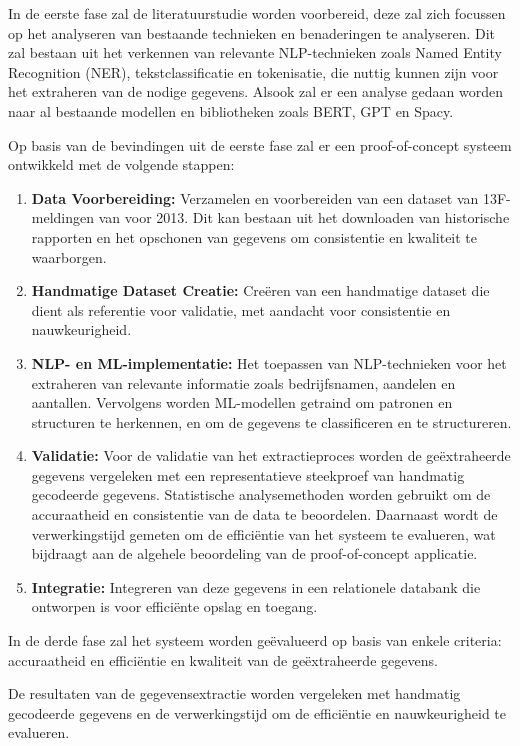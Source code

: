 In de eerste fase zal de literatuurstudie worden voorbereid, deze zal zich focussen op het analyseren van bestaande technieken en benaderingen te analyseren. Dit zal bestaan uit het verkennen van relevante NLP-technieken zoals Named Entity Recognition (NER), tekstclassificatie en tokenisatie, die nuttig kunnen zijn voor het extraheren van de nodige gegevens. Alsook zal er een analyse gedaan worden naar al bestaande modellen en bibliotheken zoals BERT, GPT en Spacy.

Op basis van de bevindingen uit de eerste fase zal er een proof-of-concept systeem ontwikkeld met de volgende stappen:
\begin{enumerate}
    \item \textbf{Data Voorbereiding:} Verzamelen en voorbereiden van een dataset van 13F- meldingen van voor 2013. Dit kan bestaan uit het downloaden van historische rapporten en het opschonen van gegevens om consistentie en kwaliteit te waarborgen.
    \item \textbf{Handmatige Dataset Creatie:} Creëren van een handmatige dataset die dient als referentie voor validatie, met aandacht voor consistentie en nauwkeurigheid.
    \item \textbf{NLP- en ML-implementatie:} Het toepassen van NLP-technieken voor het extraheren van relevante informatie zoals bedrijfsnamen, aandelen en aantallen. Vervolgens worden ML-modellen getraind om patronen en structuren te herkennen, en om de gegevens te classificeren en te structureren.
    \item \textbf{Validatie:} Voor de validatie van het extractieproces worden de geëxtraheerde gegevens vergeleken met een representatieve steekproef van handmatig gecodeerde gegevens. Statistische analysemethoden worden gebruikt om de accuraatheid en consistentie van de data te beoordelen. Daarnaast wordt de verwerkingstijd gemeten om de efficiëntie van het systeem te evalueren, wat bijdraagt aan de algehele beoordeling van de proof-of-concept applicatie.
    \item \textbf{Integratie:} Integreren van deze gegevens in een relationele databank die ontworpen is voor efficiënte opslag en toegang.
\end{enumerate}

In de derde fase zal het systeem worden geëvalueerd op basis van enkele criteria: accuraatheid en efficiëntie en kwaliteit van de geëxtraheerde gegevens.

De resultaten van de gegevensextractie worden vergeleken met handmatig gecodeerde gegevens en de verwerkingstijd om de efficiëntie en nauwkeurigheid te evalueren. 

